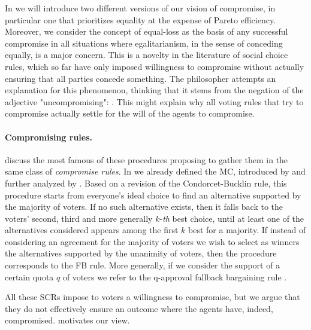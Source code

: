 In  we will introduce two different versions of our vision of compromise, in particular one that prioritizes equality at the expense of Pareto efficiency. Moreover, we consider the concept of equal-loss as the basis of any successful compromise in all situations where egalitarianism, in the sense of conceding equally, is a major concern.
This is a novelty in the literature of social choice rules, which so far have only imposed willingness to compromise without actually ensuring that all parties concede something.
The philosopher \citet{Day1989} attempts an explanation for this phenomenon, thinking that it stems from the negation of the adjective "uncompromising": 
\textit{}.
This might explain why all voting rules that try to compromise actually settle for the will of the agents to compromise. 
\paragraph{Compromising rules.}
\cite{Merlin2019} discuss the most famous of these procedures proposing to gather them in the same class of \textit{compromise rules}.
In  we already defined the \acl{MC}, introduced by \citet{Sertel1986} and further analyzed by \citet{Sertel1999}. Based on a revision of the Condorcet-Bucklin rule, this procedure starts from everyone’s ideal choice to find an alternative supported by the majority of voters. If no such alternative exists, then it falls back to the voters’ second, third and more generally $k$-\emph{th} best choice, until at least one of the alternatives considered appears among the first $k$ best for a majority.
If instead of considering an agreement for the majority of voters we wish to select as winners the alternatives supported by the unanimity of voters, then the procedure corresponds to the \acl{FB} rule. 
More generally, if we consider the support of a certain quota $q$ of voters we refer to the q-approval fallback bargaining rule \citep{Brams2001}.

All these \acp{SCR} impose to voters a willingness to compromise, but we argue that they do not effectively ensure an outcome where the agents have, indeed, compromised.  motivates our view.

